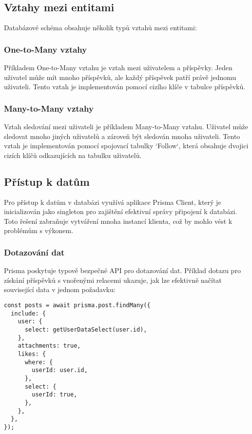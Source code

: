 \documentclass[12pt]{article}
\begin{document}
\subsection{Vztahy mezi entitami}

Databázové schéma obsahuje několik typů vztahů mezi entitami:

\subsubsection{One-to-Many vztahy}

Příkladem One-to-Many vztahu je vztah mezi uživatelem a příspěvky. Jeden uživatel může mít mnoho příspěvků, ale každý příspěvek patří právě jednomu uživateli. Tento vztah je implementován pomocí cizího klíče v tabulce příspěvků.

\subsubsection{Many-to-Many vztahy}

Vztah sledování mezi uživateli je příkladem Many-to-Many vztahu. Uživatel může sledovat mnoho jiných uživatelů a zároveň být sledován mnoha uživateli. Tento vztah je implementován pomocí spojovací tabulky `Follow`, která obsahuje dvojici cizích klíčů odkazujících na tabulku uživatelů.

\subsection{Přístup k datům}

Pro přístup k datům v databázi využívá aplikace Prisma Client, který je inicializován jako singleton pro zajištění efektivní správy připojení k databázi. Toto řešení zabraňuje vytváření mnoha instancí klienta, což by mohlo vést k problémům s výkonem.

\subsubsection{Dotazování dat}

Prisma poskytuje typově bezpečné API pro dotazování dat. Příklad dotazu pro získání příspěvků s vnořenými relacemi ukazuje, jak lze efektivně načítat související data v jednom požadavku:

\begin{lstlisting}[style=typescript]
const posts = await prisma.post.findMany({
  include: {
    user: {
      select: getUserDataSelect(user.id),
    },
    attachments: true,
    likes: {
      where: {
        userId: user.id,
      },
      select: {
        userId: true,
      },
    },
  },
});
\end{lstlisting}
\end{document}
